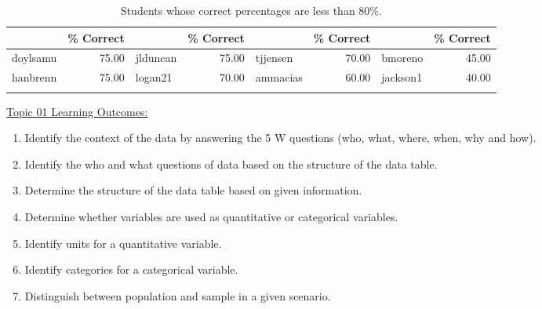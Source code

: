 \documentclass[12pt,english,nohyper]{tufte-handout}\usepackage[]{graphicx}\usepackage[]{color}
\begin{document}
\begin{fullwidth}
\makeatletter\setlength\hsize{\@tufte@fullwidth}\makeatother
\begin{longtable}{rr|lr|lr|lr}
  \hline
  & \% Correct &   & \% Correct &   & \% Correct &   & \% Correct \\ 
  \hline
doylsamu & 75.00 & jlduncan & 75.00 & tjjensen & 70.00 & bmoreno & 45.00 \\ 
  hanbrenn & 75.00 & logan21 & 70.00 & ammacias & 60.00 & jackson1 & 40.00 \\ 
   \hline
\hline
\caption{Students whose correct percentages are less than 80\%.} 
\label{tab:studentsbelow80}
\end{longtable}

\end{fullwidth}



\vspace{-2mm}

\noindent
\underline{Topic 01 Learning Outcomes:}
\vspace{2mm}

\begin{fullwidth}
\begin{enumerate}[label=\Alph*.,itemsep=-\parsep,leftmargin=*]
  \item
Identify the context of the data by answering the 5 W questions (who, what, where, when, why and how).
\item Identify the who and what questions of data based on the structure of the data table.
\item Determine the structure of the data table based on given information.
\item Determine whether variables are used as quantitative or categorical variables.
\item Identify units for a quantitative variable.
\item Identify categories for a categorical variable.
\item Distinguish between population and sample in a given scenario.

\end{enumerate}
\end{fullwidth}



\vspace{5mm}
\end{document}
